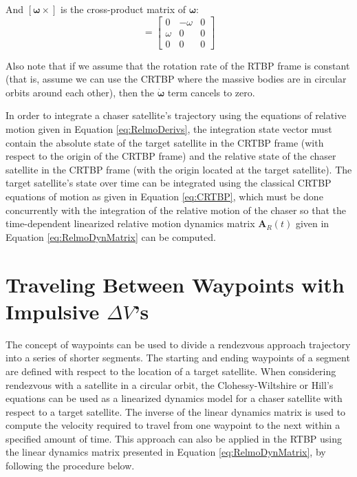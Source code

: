 \documentclass[a4paper]{article}
\begin{document}
And  \([\boldsymbol{\omega}\times]\) is the cross-product matrix of \(\boldsymbol{\omega}\):
\begin{equation*}
[\boldsymbol{\omega}\times] = \begin{bmatrix}
								0           & -\omega & 0 \\ 
								\omega & 0             & 0 \\
								0           & 0             & 0
								\end{bmatrix}
\end{equation*}

Also note that if we assume that the rotation rate of the RTBP frame is constant (that is, assume we can use the CRTBP where the massive bodies are in circular orbits around each other), then the \(\boldsymbol{\dot{\omega}}\) term cancels to zero.


In order to integrate a chaser satellite's trajectory using the equations of relative motion given in Equation \ref{eq:RelmoDerivs}, the integration state vector must contain the absolute state of the target satellite in the CRTBP frame (with respect to the origin of the CRTBP frame) and the relative state of the chaser satellite in the CRTBP frame (with the origin located at the target satellite).  The target satellite's state over time can be integrated using the classical CRTBP equations of motion as given in Equation \ref{eq:CRTBP}, which must be done concurrently with the integration of the relative motion of the chaser so that the time-dependent linearized relative motion dynamics matrix \(\mathbf{A}_R(t)\) given in Equation \ref{eq:RelmoDynMatrix} can be computed.

\section{Traveling Between Waypoints with Impulsive \(\Delta V\)'s}

The concept of waypoints can be used to divide a rendezvous approach trajectory into a series of shorter segments.  The starting and ending waypoints of a segment are defined with respect to the location of a target satellite.  When considering rendezvous with a satellite in a circular orbit, the Clohessy-Wiltshire or Hill's equations can be used as a linearized dynamics model for a chaser satellite with respect to a target satellite.  The inverse of the linear dynamics matrix is used to compute the velocity required to travel from one waypoint to the next within a specified amount of time.  This approach can also be applied in the RTBP using the linear dynamics matrix presented in Equation \ref{eq:RelmoDynMatrix}, by following the procedure below.
\end{document}
